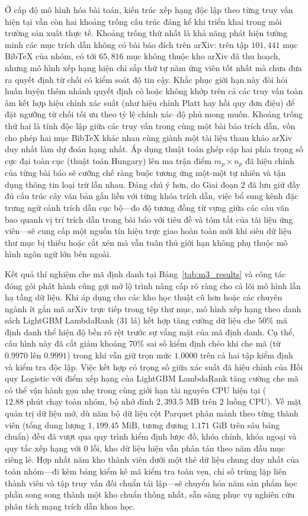 Ở cấp độ mô hình hóa bài toán, kiến trúc xếp hạng độc lập theo từng truy vấn hiện tại vẫn còn hai khoảng trống cấu trúc đáng kể khi triển khai trong môi trường sản xuất thực tế. Khoảng trống thứ nhất là khả năng phát hiện tường minh các mục trích dẫn không có bài báo đích trên arXiv: trên tập $101{,}441$ mục BibTeX của nhóm, có tới $65{,}816$ mục không thuộc kho arXiv đã thu hoạch, nhưng mô hình xếp hạng hiện chỉ sắp thứ tự năm ứng viên tốt nhất mà chưa đưa ra quyết định từ chối có kiểm soát độ tin cậy. Khắc phục giới hạn này đòi hỏi huấn luyện thêm nhánh quyết định có hoặc không khớp trên cả các truy vấn toàn âm kết hợp hiệu chỉnh xác suất (như hiệu chỉnh Platt hay hồi quy đơn điệu) để đặt ngưỡng từ chối tối ưu theo tỷ lệ chính xác--độ phủ mong muốn. Khoảng trống thứ hai là tính độc lập giữa các truy vấn trong cùng một bài báo trích dẫn, vốn cho phép hai mục BibTeX khác nhau cùng giành một tài liệu tham khảo arXiv duy nhất làm dự đoán hạng nhất. Áp dụng thuật toán ghép cặp hai phía trọng số cực đại toàn cục (thuật toán Hungary) lên ma trận điểm $m_p \times n_p$ đã hiệu chỉnh của từng bài báo sẽ cưỡng chế ràng buộc tương ứng một-một tự nhiên và tận dụng thông tin loại trừ lẫn nhau. Đáng chú ý hơn, do Giai đoạn 2 đã lưu giữ đầy đủ cấu trúc cây văn bản gắn liền với từng khóa trích dẫn, việc bổ sung kênh đặc trưng ngữ cảnh trích dẫn cục bộ---đo độ tương đồng từ vựng giữa các câu văn bao quanh vị trí trích dẫn trong bài báo với tiêu đề và tóm tắt của tài liệu ứng viên---sẽ cung cấp một nguồn tín hiệu trực giao hoàn toàn mới khi siêu dữ liệu thư mục bị thiếu hoặc cắt xén mà vẫn tuân thủ giới hạn không phụ thuộc mô hình ngôn ngữ lớn bên ngoài.

Kết quả thí nghiệm che mã định danh tại Bảng~\ref{tab:m3_results} và công tác đóng gói phát hành cũng gợi mở lộ trình nâng cấp rõ ràng cho cả lõi mô hình lẫn hạ tầng dữ liệu. Khi áp dụng cho các kho học thuật cũ hơn hoặc các chuyên ngành ít gắn mã arXiv trực tiếp trong tệp thư mục, mô hình xếp hạng theo danh sách LightGBM LambdaRank ($31$ lá) kết hợp tăng cường dữ liệu che $50\%$ mã định danh thể hiện độ bền rõ rệt trước sự vắng mặt của mã định danh. Cụ thể, cấu hình này đã cắt giảm khoảng $70\%$ sai số kiểm định chéo khi che mã (từ $0.9970$ lên $0.9991$) trong khi vẫn giữ trọn mức $1.0000$ trên cả hai tập kiểm định và kiểm tra độc lập. Việc kết hợp có trọng số giữa xác suất đã hiệu chỉnh của Hồi quy Logistic với điểm xếp hạng của LightGBM LambdaRank tăng cường che mã có thể vận hành gọn nhẹ trong cùng giới hạn tài nguyên CPU hiện tại ($12.88\text{ phút}$ chạy toàn nhóm, bộ nhớ đỉnh $2{,}393.5\text{ MB}$ trên $2$ luồng CPU). Về mặt quản trị dữ liệu mở, dù năm bộ dữ liệu cột Parquet phân mảnh theo từng thành viên (tổng dung lượng $1{,}199.45\text{ MiB}$, tương đương $1.171\text{ GiB}$ trên sáu bảng chuẩn) đều đã vượt qua quy trình kiểm định lược đồ, khóa chính, khóa ngoại và quy tắc xếp hạng với $0$ lỗi, kho dữ liệu hiện vẫn phân tán theo năm đầu mục riêng lẻ. Hợp nhất năm kho thành viên dưới một thẻ dữ liệu chung duy nhất của toàn nhóm---đi kèm bảng kiểm kê mã kiểm tra toàn vẹn, chỉ số trùng lặp liên thành viên và tập truy vấn đối chuẩn tái lập---sẽ chuyển hóa năm sản phẩm học phần song song thành một kho chuẩn thống nhất, sẵn sàng phục vụ nghiên cứu phân tích mạng trích dẫn khoa học.
